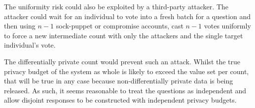 \documentclass[10pt,a4paper]{article}
\begin{document}
The uniformity risk could also be exploited by a third-party attacker. The attacker could wait for an individual to vote into a fresh batch for a question and then using $n-1$ sock-puppet or compromise accounts, cast $n-1$ votes uniformly to force a new intermediate count with only the attackers and the single target individual's vote. 

The differentially private count would prevent such an attack. Whilst the true privacy budget of the system as whole is likely to exceed the value set per count, that will be true in any case because non-differentially private data is being released. As such, it seems reasonable to treat the questions as independent and allow disjoint responses to be constructed with independent privacy budgets. 




\end{document}
